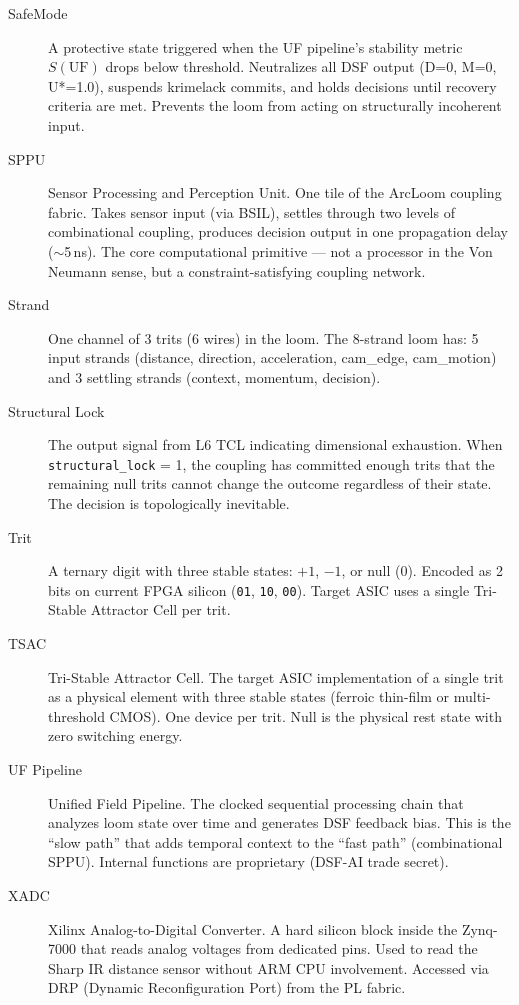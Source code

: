 \documentclass[11pt,a4paper]{article}
\begin{document}
\begin{description}
\item[SafeMode] A protective state triggered when the UF pipeline's stability metric $S(\text{UF})$ drops below threshold. Neutralizes all DSF output (D=0, M=0, U*=1.0), suspends krimelack commits, and holds decisions until recovery criteria are met. Prevents the loom from acting on structurally incoherent input.

\item[SPPU] Sensor Processing and Perception Unit. One tile of the ArcLoom coupling fabric. Takes sensor input (via BSIL), settles through two levels of combinational coupling, produces decision output in one propagation delay ($\sim$5\,ns). The core computational primitive --- not a processor in the Von Neumann sense, but a constraint-satisfying coupling network.

\item[Strand] One channel of 3 trits (6 wires) in the loom. The 8-strand loom has: 5 input strands (distance, direction, acceleration, cam\_edge, cam\_motion) and 3 settling strands (context, momentum, decision).

\item[Structural Lock] The output signal from L6 TCL indicating dimensional exhaustion. When \texttt{structural\_lock} = 1, the coupling has committed enough trits that the remaining null trits cannot change the outcome regardless of their state. The decision is topologically inevitable.

\item[Trit] A ternary digit with three stable states: $+1$, $-1$, or null (0). Encoded as 2 bits on current FPGA silicon (\texttt{01}, \texttt{10}, \texttt{00}). Target ASIC uses a single Tri-Stable Attractor Cell per trit.

\item[TSAC] Tri-Stable Attractor Cell. The target ASIC implementation of a single trit as a physical element with three stable states (ferroic thin-film or multi-threshold CMOS). One device per trit. Null is the physical rest state with zero switching energy.

\item[UF Pipeline] Unified Field Pipeline. The clocked sequential processing chain that analyzes loom state over time and generates DSF feedback bias. This is the ``slow path'' that adds temporal context to the ``fast path'' (combinational SPPU). Internal functions are proprietary (DSF-AI trade secret).

\item[XADC] Xilinx Analog-to-Digital Converter. A hard silicon block inside the Zynq-7000 that reads analog voltages from dedicated pins. Used to read the Sharp IR distance sensor without ARM CPU involvement. Accessed via DRP (Dynamic Reconfiguration Port) from the PL fabric.

\end{description}
\end{document}
